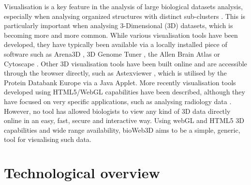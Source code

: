 \documentclass{bioinfo}
\begin{document}
Visualisation is a key feature in the analysis of large biological datasets analysis, especially when analysing organized structures with distinct sub-clusters \citep{Rubel10}. This is particularly important when analysing 3-Dimensional (3D) datasets, which is becoming more and more common. While various visualisation tools have been developed, they have typically been available via a locally installed piece of software such as Arena3D \citep{Pavlopoulos08},  3D Genome Tuner \citep{Wang09}, the Allen Brain Atlas \citep{Lein07} or Cytoscape \citep{Shannon03}. Other 3D visualisation tools have been built online and are accessible through the browser directly, such as Astexviewer \citep{Hartshorn02}, which is utilised by the Protein Databank Europe via a Java Applet. More recently visualisation tools developed using HTML5/WebGL capabilities have been described, although they have focused on very specific applications, such as analysing radiology data  \citep{Dinesh12}. However, no tool has allowed biologists to view any kind of 3D data directly online in an easy, fast, secure and interactive way. Using webGL and HTML5 3D capabilities and wide range availability, bioWeb3D aims to be a simple, generic, tool for visualising such data.



\section{Technological overview}
\end{document}
